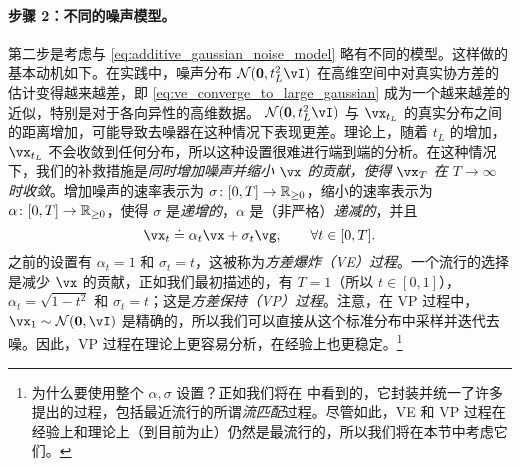 \documentclass[../../book-main_zh.tex]{subfiles}
\begin{document}
\paragraph{步骤 2：不同的噪声模型。} 第二步是考虑与 \eqref{eq:additive_gaussian_noise_model} 略有不同的模型。这样做的基本动机如下。在实践中，噪声分布 \(\dNorm(\vzero, t_{L}^{2}\vI)\) 在高维空间中对真实协方差的估计变得越来越差，即 \eqref{eq:ve_converge_to_large_gaussian} 成为一个越来越差的近似，特别是对于各向异性的高维数据。 \(\dNorm(\vzero, t_{L}^{2}\vI)\) 与 \(\vx_{t_{L}}\) 的真实分布之间的距离增加，可能导致去噪器在这种情况下表现更差。理论上，随着 \(t_{L}\) 的增加，\(\vx_{t_{L}}\) 不会收敛到任何分布，所以这种设置很难进行端到端的分析。在这种情况下，我们的补救措施是\textit{同时增加噪声并缩小 \(\vx\) 的贡献，使得 \(\vx_{T}\) 在 \(T \to \infty\) 时收敛}。增加噪声的速率表示为 \(\sigma \colon [0, T] \to \mathbb{R}_{\geq 0}\)，缩小的速率表示为 \(\alpha \colon [0, T] \to \mathbb{R}_{\geq 0}\)，使得 \(\sigma\) 是\textit{递增的}，\(\alpha\) 是（非严格）\textit{递减的}，并且
\begin{equation}\label{eq:gen_additive_gaussian_noise_model}
	\vx_{t} \doteq \alpha_{t}\vx + \sigma_{t}\vg, \qquad \forall t \in [0, T].
\end{equation}
之前的设置有 \(\alpha_{t} = 1\) 和 \(\sigma_{t} = t\)，这被称为\textit{方差爆炸（VE）过程}。一个流行的选择是减少 \(\vx\) 的贡献，正如我们最初描述的，有 \(T = 1\)（所以 \(t \in [0, 1]\)），\(\alpha_{t} = \sqrt{1 - t^{2}}\) 和 \(\sigma_{t} = t\)；这是\textit{方差保持（VP）过程}。注意，在 VP 过程中，\(\vx_{1} \sim \dNorm(\vzero, \vI)\) 是精确的，所以我们可以直接从这个标准分布中采样并迭代去噪。因此，VP 过程在理论上更容易分析，在经验上也更稳定。\footnote{为什么要使用整个 \(\alpha, \sigma\) 设置？正如我们将在  中看到的，它封装并统一了许多提出的过程，包括最近流行的所谓\textit{流匹配}过程。尽管如此，VE 和 VP 过程在经验上和理论上（到目前为止）仍然是最流行的，所以我们将在本节中考虑它们。}
\end{document}
